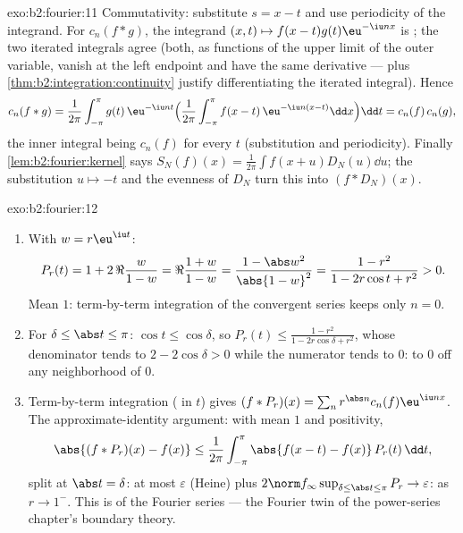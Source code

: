 \begin{solution}{exo:b2:fourier:11}
Commutativity: substitute $s = x - t$ and use periodicity of
the integrand. For $c_n(f * g)$, the integrand $(x, t) \mapsto
f(x-t)g(t)\eu^{-\iu nx}$ is ; the two iterated
integrals agree (both, as functions of the upper limit of the
outer variable, vanish at the left endpoint and have the same
derivative ---  plus
\cref{thm:b2:integration:continuity} justify differentiating
the iterated integral). Hence
\[
c_n(f*g) = \frac{1}{2\pi}\int_{-\pi}^{\pi} g(t)\,\eu^{-\iu nt}
\Bigl(\frac{1}{2\pi}\int_{-\pi}^{\pi}
f(x-t)\,\eu^{-\iu n(x-t)}\dd x\Bigr)\dd t
= c_n(f)\,c_n(g),
\]
the inner integral being $c_n(f)$ for every $t$ (substitution
and periodicity). Finally \cref{lem:b2:fourier:kernel} says
$S_N(f)(x) = \frac{1}{2\pi}\int f(x+u)D_N(u)\dd u$; the
substitution $u \mapsto -t$ and the evenness of $D_N$ turn this
into $(f * D_N)(x)$.
\end{solution}

\begin{solution}{exo:b2:fourier:12}
\begin{enumerate}
  \item With $w = r\eu^{\iu t}$:
        \[
        P_r(t) = 1 + 2\,\Re\frac{w}{1 - w}
        = \Re\frac{1 + w}{1 - w}
        = \frac{1 - \abs w^2}{\abs{1 - w}^2}
        = \frac{1 - r^2}{1 - 2r\cos t + r^2} > 0 .
        \]
        Mean $1$: term-by-term integration of the 
        convergent series keeps only $n = 0$.
  \item For $\delta \leq \abs t \leq \pi$: $\cos t \leq
        \cos\delta$, so $P_r(t) \leq \frac{1 - r^2}{1 -
        2r\cos\delta + r^2}$, whose denominator tends to $2 -
        2\cos\delta > 0$ while the numerator tends to $0$:
         to $0$ off any neighborhood of
        $0$.
  \item Term-by-term integration ( in $t$)
        gives $(f * P_r)(x) = \sum_n r^{\abs
        n}c_n(f)\eu^{\iu nx}$. The approximate-identity
        argument: with mean $1$ and positivity,
        \[
        \abs{(f*P_r)(x) - f(x)}
        \leq \frac{1}{2\pi}\int_{-\pi}^{\pi}
        \abs{f(x-t) - f(x)}\,P_r(t)\,\dd t ,
        \]
        split at $\abs t = \delta$: at most $\varepsilon$
        (Heine) plus $2\norm f_\infty\sup_{\delta\leq\abs
        t\leq\pi}P_r \to \varepsilon$:  as
        $r \to 1^-$. This is  of the Fourier
        series --- the Fourier twin of the power-series
        chapter's boundary theory.
\end{enumerate}
\end{solution}

